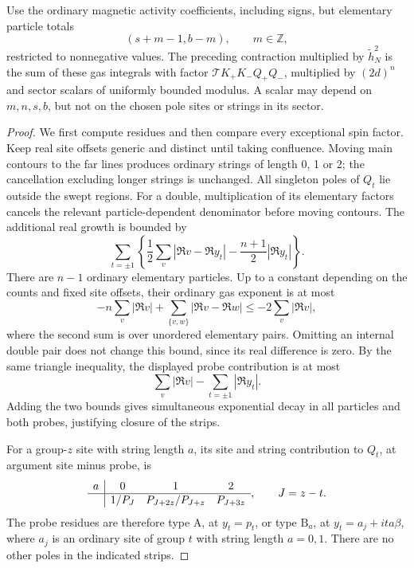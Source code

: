 \begin{lemma}\label{09_fast_paths:one-arc-identity}
Use the ordinary magnetic activity coefficients, including signs, but
elementary particle totals
\[
                  (s+m-1,b-m),\qquad m\in\mathbb Z,
\]
restricted to nonnegative values.  The preceding contraction multiplied
by \(\widetilde h_N^2\) is the sum of these gas integrals with factor
\(\mathcal T K_+K_-Q_+Q_-\), multiplied by \((2d)^n\) and sector
scalars of uniformly bounded modulus.  A scalar may depend on
\(m,n,s,b\), but not on the chosen pole sites or strings in its sector.
\end{lemma}
\begin{proof}
We first compute residues and then compare every exceptional spin factor.
Keep real site offsets generic and distinct until taking confluence.
Moving main contours to the far lines produces ordinary strings of
length 0, 1 or 2; the cancellation excluding longer strings is unchanged.
All singleton poles of \(Q_t\) lie outside the swept regions.  For a
double, multiplication of its elementary factors cancels the relevant
particle-dependent denominator before moving contours.  The additional
real growth is bounded by
\[
 \sum_{t=\pm1}\left\{
 \frac12\sum_v|\Re v-\Re y_t|
               -\frac{n+1}{2}|\Re y_t|\right\}.
\]
There are \(n-1\) ordinary elementary particles.  Up to a constant
depending on the counts and fixed site offsets, their ordinary gas
exponent is at most
\[
 -n\sum_v|\Re v|+\sum_{\{v,w\}}|\Re v-\Re w|
 \le -2\sum_v|\Re v|,
\]
where the second sum is over unordered elementary pairs.  Omitting
an internal double pair does not change this bound, since its real
difference is zero.  By the same triangle inequality, the displayed
probe contribution is at most
\[
 \sum_v|\Re v|-\sum_{t=\pm1}|\Re y_t|.
\]
Adding the two bounds gives simultaneous exponential decay in all
particles and both probes, justifying closure of the strips.

For a group-\(z\) site with string length \(a\), its site and string
contribution to \(Q_t\), at argument site minus probe, is
\[
\begin{array}{c|ccc}
 a&0&1&2\\ \hline
 &1/P_J&P_{J+2z}/P_{J+z}&P_{J+3z}
\end{array},\qquad J=z-t.
\]
The probe residues are therefore type \(\mathrm A\), at \(y_t=p_t\),
or type \(\mathrm B_a\), at \(y_t=a_j+ita\beta\), where \(a_j\)
is an ordinary site of group \(t\) with string length \(a=0,1\).
There are no other poles in the indicated strips.


\end{proof}
